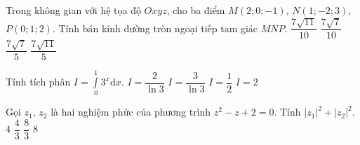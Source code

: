 \begin{ex}%
	Trong không gian với hệ tọa độ $ Oxyz $, cho ba điểm $ M(2;0;-1) $, $ N(1;-2;3) $, $ P(0;1;2) $. Tính bán kính đường tròn ngoại tiếp tam giác $ MNP $.
	\choice
	{\True $ \dfrac{7\sqrt{11}}{10} $}
	{$ \dfrac{7\sqrt{7}}{10} $}
	{$ \dfrac{7\sqrt{7}}{5} $}
	{$ \dfrac{7\sqrt{11}}{5} $}
\end{ex}
\begin{ex}%
	Tính tích phân $ I=\displaystyle\int\limits_{0}^{1}3^{x}\mathrm{d}x $.
	\choice
	{\True $ I=\dfrac{2}{\ln 3} $}
	{$ I=\dfrac{3}{\ln 3} $}
	{$ I=\dfrac{1}{2} $}
	{$ I=2 $}
\end{ex}
\begin{ex}%
	Gọi $ z_{1} $, $ z_{2} $ là hai nghiệm phức của phương trình $ z^{2}-z+2=0 $. Tính $ |z_{1}|^{2}+|z_{2}|^{2} $.
	\choice
	{\True $ 4 $}
	{$ \dfrac{4}{3} $}
	{$ \dfrac{8}{3} $}
	{$ 8 $}
\end{ex}
